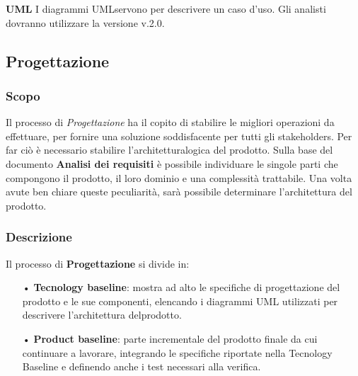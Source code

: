 				\textbf{UML} \newline \newline
				I diagrammi UML\glo servono per descrivere un caso d'uso. Gli analisti dovranno utilizzare la versione v.2.0. \newline \newline
	\subsection{Progettazione}
		\subsubsection{Scopo}
		Il processo di \textit{Progettazione} ha il copito di stabilire le migliori operazioni da effettuare, per fornire una soluzione soddisfacente per tutti gli stakeholders\glo. Per far ciò è necessario stabilire l'architettura\glo logica del prodotto. Sulla base del documento \textbf{Analisi dei requisiti} è possibile individuare le singole parti che compongono il prodotto, il loro dominio e una complessità trattabile. Una volta avute ben chiare queste peculiarità, sarà possibile determinare l'architettura del prodotto.
		\subsubsection{Descrizione}
		Il processo di \textbf{Progettazione} si divide in:
			\begin{itemize}
				\item[•] \textbf{Tecnology baseline}: mostra ad alto le specifiche di progettazione del prodotto e le sue componenti, elencando i diagrammi UML utilizzati per descrivere l'architettura delprodotto.
				\item[•] \textbf{Product baseline}: parte incrementale del prodotto finale da cui continuare a lavorare, integrando le specifiche riportate nella Tecnology Baseline e  definendo anche i test necessari alla verifica.
			\end{itemize} 
